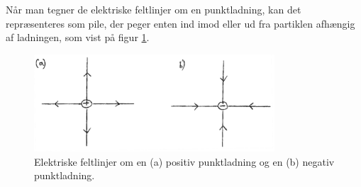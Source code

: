 Når man tegner de elektriske feltlinjer om en punktladning, kan det repræsenteres som pile, der peger enten ind imod eller ud fra partiklen afhængig af ladningen, som vist på figur \ref{fig:pointcharges}.
\begin{figure}[h!]
    \centering
    \includegraphics[width=0.8\textwidth]{Elektro/Figurer/fieldline_pointcharges.PNG}
    \caption{Elektriske feltlinjer om en (a) positiv punktladning og en (b) negativ punktladning.}
    \label{fig:pointcharges}
\end{figure}

